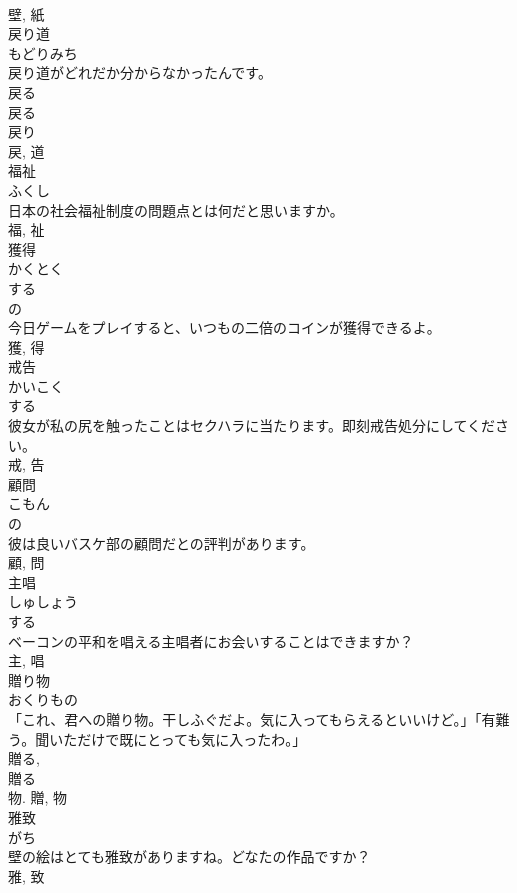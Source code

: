 \documentclass[8pt]{extreport}
\begin{document}
\begin{CJK}{UTF8}{min}
\\	壁, 紙	
\\	戻り道	
\\	もどりみち	
\\	戻り道がどれだか分からなかったんです。	
\\	戻る 
\\	戻る 
\\	戻り 
\\	戻, 道	
\\	福祉	
\\	ふくし	
\\	日本の社会福祉制度の問題点とは何だと思いますか。	
\\	福, 祉	
\\	獲得	
\\	かくとく	
\\	する 
\\	の 
\\	今日ゲームをプレイすると、いつもの二倍のコインが獲得できるよ。	
\\	獲, 得	
\\	戒告	
\\	かいこく	
\\	する 
\\	彼女が私の尻を触ったことはセクハラに当たります。即刻戒告処分にしてください。	
\\	戒, 告	
\\	顧問	
\\	こもん	
\\	の 
\\	彼は良いバスケ部の顧問だとの評判があります。	
\\	顧, 問	
\\	主唱	
\\	しゅしょう	
\\	する 
\\	ベーコンの平和を唱える主唱者にお会いすることはできますか？	
\\	主, 唱	
\\	贈り物	
\\	おくりもの	
\\	「これ、君への贈り物。干しふぐだよ。気に入ってもらえるといいけど。」「有難う。聞いただけで既にとっても気に入ったわ。」	
\\	贈る, 
\\	贈る 
\\	物.	贈, 物	
\\	雅致	
\\	がち	
\\	壁の絵はとても雅致がありますね。どなたの作品ですか？	
\\	雅, 致	

\end{CJK}
\end{document}
